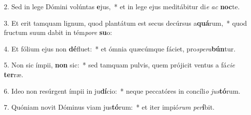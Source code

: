 2. Sed in lege Dómini volúntas \textbf{e}jus,~*  et in lege ejus meditábitur di\textit{e} \textit{ac} \textbf{noc}te.\

3. Et erit tamquam lignum, quod plantátum est secus decúrsus a\textbf{quá}rum,~*  quod fructum suum dabit in tém\textit{po}\textit{re} \textbf{su}o:\

4. Et fólium ejus non \textbf{dé}fluet:~*  et ómnia quæcúmque fáciet, pro\textit{spe}\textit{ra}\textbf{bún}tur.\

5. Non sic ímpii, \textbf{non} sic:~*  sed tamquam pulvis, quem prójicit ventus a fá\textit{ci}\textit{e} \textbf{ter}ræ.\

6. Ideo non resúrgent ímpii in ju\textbf{dí}cio:~*  neque peccatóres in concíli\textit{o} \textit{jus}\textbf{tó}rum.\

7. Quóniam novit Dóminus viam jus\textbf{tó}rum:~*  et iter impió\textit{rum} \textit{per}\textbf{í}bit.\

